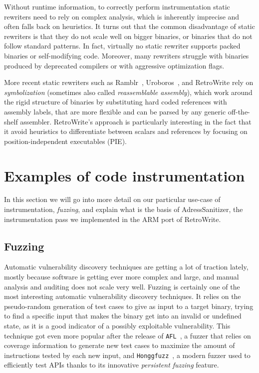 \documentclass[a4paper,11pt,oneside]{report}
\newcommand{\sysname}{RetroWrite\xspace}
\begin{document}
Without runtime information, to correctly perform instrumentation static 
rewriters need to rely on complex analysis, which is inherently imprecise and 
often falls back on heuristics. It turns out that the common disadvantage of 
static rewriters is that they do not scale well on bigger binaries, or binaries 
that do not follow standard patterns. In fact, virtually no static rewriter 
supports packed binaries or self-modifying code. Moreover, many rewriters 
struggle with binaries produced by deprecated compilers or with aggressive 
optimization flags. 

More recent static rewriters such as Ramblr~\cite{ramblr}, 
Uroboros~\cite{uroboros}, and \sysname rely on \emph{symbolization} (sometimes 
also called \emph{reassemblable assembly}), which work around the rigid 
structure of binaries by substituting hard coded references with assembly 
labels, that are more flexible and can be parsed by any generic off-the-shelf 
assembler.  \sysname's approach is particularly interesting in the fact that it 
avoid heuristics to differentiate between scalars and references by focusing on 
position-independent executables (PIE). 



\section{Examples of code instrumentation}
In this section we will go into more detail on our particular use-case of 
instrumentation, \emph{fuzzing}, and explain what is the basis of 
AdressSanitizer, the instrumentation pass we implemented in the ARM port of 
\sysname. 

\subsection{Fuzzing}
Automatic vulnerability discovery techniques are getting a lot of traction 
lately, mostly because software is getting ever more complex and large, and 
manual analysis and auditing does not scale very well. Fuzzing is certainly one 
of the most interesting automatic vulnerability discovery techniques.  It 
relies on the pseudo-random generation of test cases to give as input to a 
target binary, trying to find a specific input that makes the binary get into 
an invalid or undefined state, as it is a good indicator of a possibly 
exploitable vulnerability. This technique got even more popular after the 
release of \texttt{AFL}~\cite{afl}, a fuzzer that relies on coverage  
information to generate new test cases to maximize the amount of instructions 
tested by each new input, and \texttt{Honggfuzz}~\cite{honggfuzz}, a modern 
fuzzer used to efficiently test APIs thanks to its innovative \emph{persistent 
fuzzing} feature.
\end{document}
